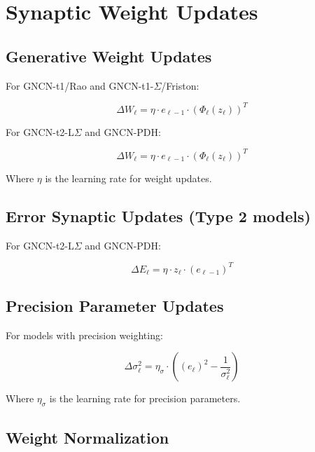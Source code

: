 \documentclass{article}
\begin{document}
\section{Synaptic Weight Updates}

\subsection{Generative Weight Updates}

For GNCN-t1/Rao and GNCN-t1-$\Sigma$/Friston:

\begin{equation}
  \Delta W_\ell = \eta \cdot e_{\ell-1} \cdot (\Phi_\ell(z_\ell))^T
\end{equation}

For GNCN-t2-L$\Sigma$ and GNCN-PDH:

\begin{equation}
  \Delta W_\ell = \eta \cdot e_{\ell-1} \cdot (\Phi_\ell(z_\ell))^T
\end{equation}

Where $\eta$ is the learning rate for weight updates.

\subsection{Error Synaptic Updates (Type 2 models)}

For GNCN-t2-L$\Sigma$ and GNCN-PDH:

\begin{equation}
  \Delta E_\ell = \eta \cdot z_\ell \cdot (e_{\ell-1})^T
\end{equation}

\subsection{Precision Parameter Updates}

For models with precision weighting:

\begin{equation}
  \Delta \sigma_\ell^2 = \eta_\sigma \cdot ((e_\ell)^2 - \frac{1}{\sigma_\ell^2})
\end{equation}

Where $\eta_\sigma$ is the learning rate for precision parameters.

\subsection{Weight Normalization}
\end{document}
